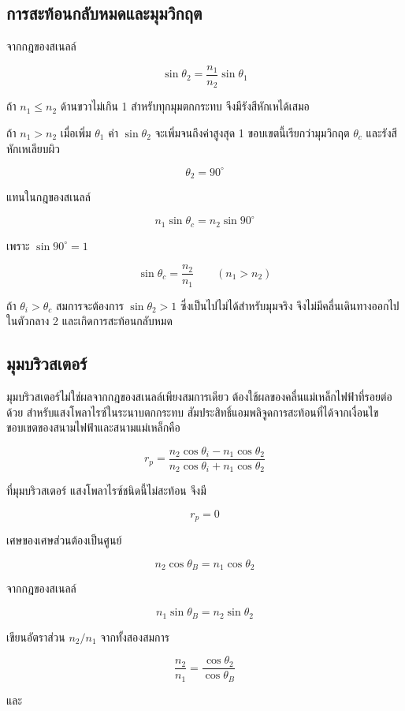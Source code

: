 \subsection{การสะท้อนกลับหมดและมุมวิกฤต}

จากกฎของสเนลล์

\[
\sin\theta_2=\frac{n_1}{n_2}\sin\theta_1
\]

ถ้า $n_1\le n_2$ ด้านขวาไม่เกิน 1 สำหรับทุกมุมตกกระทบ จึงมีรังสีหักเหได้เสมอ

ถ้า $n_1>n_2$ เมื่อเพิ่ม $\theta_1$ ค่า $\sin\theta_2$ จะเพิ่มจนถึงค่าสูงสุด 1 ขอบเขตนี้เรียกว่ามุมวิกฤต $\theta_c$ และรังสีหักเหเลียบผิว

\[
\theta_2=90^\circ
\]

แทนในกฎของสเนลล์

\[
n_1\sin\theta_c=n_2\sin90^\circ
\]

เพราะ $\sin90^\circ=1$

\begin{tcolorbox}[title={มุมวิกฤต}]
\[
\boxed{\sin\theta_c=\frac{n_2}{n_1}}
\qquad (n_1>n_2)
\]
\end{tcolorbox}

ถ้า $\theta_i>\theta_c$ สมการจะต้องการ $\sin\theta_2>1$ ซึ่งเป็นไปไม่ได้สำหรับมุมจริง จึงไม่มีคลื่นเดินทางออกไปในตัวกลาง 2 และเกิดการสะท้อนกลับหมด

\subsection{มุมบริวสเตอร์}

มุมบริวสเตอร์ไม่ใช่ผลจากกฎของสเนลล์เพียงสมการเดียว ต้องใช้ผลของคลื่นแม่เหล็กไฟฟ้าที่รอยต่อด้วย สำหรับแสงโพลาไรซ์ในระนาบตกกระทบ สัมประสิทธิ์แอมพลิจูดการสะท้อนที่ได้จากเงื่อนไขขอบเขตของสนามไฟฟ้าและสนามแม่เหล็กคือ

\[
r_p=
\frac{n_2\cos\theta_i-n_1\cos\theta_2}
{n_2\cos\theta_i+n_1\cos\theta_2}
\]

ที่มุมบริวสเตอร์ แสงโพลาไรซ์ชนิดนี้ไม่สะท้อน จึงมี

\[
r_p=0
\]

เศษของเศษส่วนต้องเป็นศูนย์

\[
n_2\cos\theta_B=n_1\cos\theta_2
\]

จากกฎของสเนลล์

\[
n_1\sin\theta_B=n_2\sin\theta_2
\]

เขียนอัตราส่วน $n_2/n_1$ จากทั้งสองสมการ

\[
\frac{n_2}{n_1}
=
\frac{\cos\theta_2}{\cos\theta_B}
\]

และ


